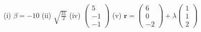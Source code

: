 \item (i) $\beta=-10$ (ii) $\sqrt{\frac{31}{2}}$ (iv) $\left(\begin{matrix}5\\
-1\\
-1
\end{matrix}\right)$ (v) $\mathbf{r}=\left(\begin{matrix}6\\
0\\
-2
\end{matrix}\right)+\lambda\left(\begin{matrix}1\\
1\\
2
\end{matrix}\right)$